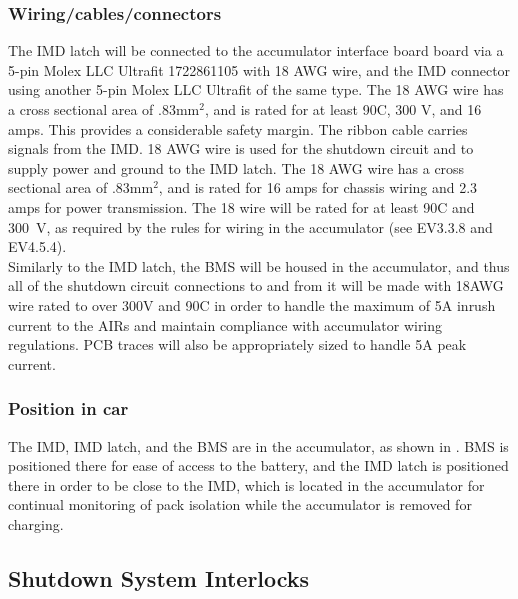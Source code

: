 \documentclass{article}
\begin{document}
\subsubsection{Wiring/cables/connectors}
The IMD latch will be connected to the accumulator interface board board via a 5-pin Molex LLC Ultrafit 1722861105 with 18 AWG wire, and the IMD connector using another 5-pin Molex LLC Ultrafit of the same type. The 18 AWG wire has a cross sectional area of .83mm$^2$, and is rated for at least 90\textdegree C, 300 V, and 16 amps. This provides a considerable safety margin. The ribbon cable carries signals from the IMD. 18 AWG wire is used for the shutdown circuit and to supply power and ground to the IMD latch. The 18 AWG wire has a cross sectional area of .83mm$^2$, and is rated for 16 amps for chassis wiring and 2.3 amps for power transmission. The 18 wire will be rated for at least 90\textdegree C and 300~V, as required by the rules for wiring in the accumulator (see EV3.3.8 and EV4.5.4).\\


Similarly to the IMD latch, the BMS will be housed in the accumulator, and thus all of the shutdown circuit connections to and from it will be made with 18AWG wire rated to over 300V and 90\textdegree C in order to handle the maximum of 5A inrush current to the AIRs and maintain compliance with accumulator wiring regulations. PCB traces will also be appropriately sized to handle 5A peak current. 


\subsubsection{Position in car}
The IMD, IMD latch, and the BMS are in the accumulator, as shown in . BMS is positioned there for ease of access to the battery, and the IMD latch is positioned there in order to be close to the IMD, which is located in the accumulator for continual monitoring of pack isolation while the accumulator is removed for charging. 

\subsection{Shutdown System Interlocks}\label{shutdown_system_interlocks}
\end{document}
